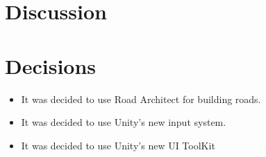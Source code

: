 \documentclass{article}
\begin{document}
    \section{Discussion}
        

    \section{Decisions}
        \begin{itemize}
            \item It was decided to use Road Architect for building roads.
            \item It was decided to use Unity's new input system.
            \item It was decided to use Unity's new UI ToolKit
        \end{itemize}
    
\end{document}
